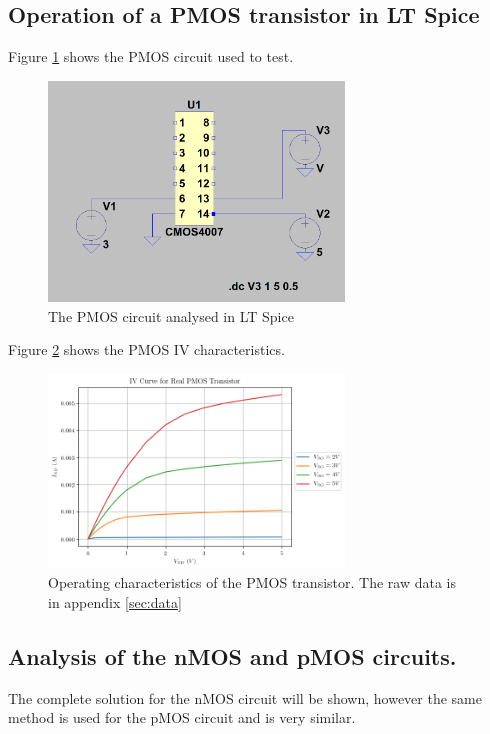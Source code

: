 \documentclass[titlepage, 12pt]{article}
\begin{document}
    \subsection{Operation of a PMOS transistor in LT Spice}
    Figure \ref{fig:part_1b_circ} shows the PMOS circuit used to test.
    \begin{figure}
        \centering
        \includegraphics[width=0.7\textwidth]{figures/pmos_circuit.png}
        \caption{The PMOS circuit analysed in LT Spice}
        \label{fig:part_1b_circ}
    \end{figure}
    Figure \ref{fig:part_1b_fig} shows the PMOS IV characteristics.
    \begin{figure}[H]
        \centering
        \includegraphics[width= 0.7\textwidth]{figures/part_3_pmos.png}
        \caption{Operating characteristics of the PMOS transistor. The
        raw data is in appendix \ref{sec:data}}
        \label{fig:part_1b_fig}
    \end{figure}


    \subsection{Analysis of the nMOS and pMOS circuits.}
    \label{sec:sim_sol1}
    The complete solution for the nMOS circuit will be shown, however
    the same method is used for the pMOS circuit and is very similar.
\end{document}
